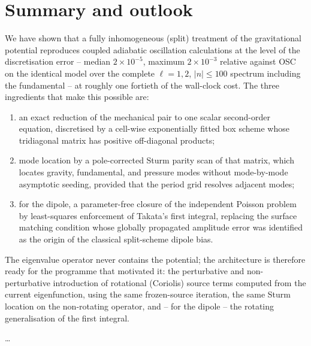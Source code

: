 \documentclass[]{aa}
\begin{document}
\section{Summary and outlook}
\label{sec:conclusion}

We have shown that a fully inhomogeneous (split) treatment of the
gravitational potential reproduces coupled adiabatic oscillation
calculations at the level of the discretisation error -- median
$2\times10^{-5}$, maximum $2\times10^{-3}$ relative against OSC on the
identical model over the complete $\ell=1,2$, $|n|\le100$ spectrum including
the fundamental -- at roughly one fortieth of the wall-clock cost.  The three
ingredients that make this possible are:

\begin{enumerate}
\item an exact reduction of the mechanical pair to one scalar second-order
  equation, discretised by a cell-wise exponentially fitted box scheme whose
  tridiagonal matrix has positive off-diagonal products;
\item mode location by a pole-corrected Sturm parity scan of that matrix,
  which locates gravity, fundamental, and pressure modes without mode-by-mode
  asymptotic seeding, provided that the period grid resolves adjacent modes;
\item for the dipole, a parameter-free closure of the independent Poisson
  problem by least-squares enforcement of Takata's first integral, replacing
  the surface matching condition whose globally propagated amplitude error
  was identified as the origin of the classical split-scheme dipole bias.
\end{enumerate}

The eigenvalue operator never contains the potential; the architecture is
therefore ready for the programme that motivated it: the perturbative and
non-perturbative introduction of rotational (Coriolis) source terms computed
from the current eigenfunction, using the same frozen-source iteration, the
same Sturm location on the non-rotating operator, and -- for the dipole --
the rotating generalisation of the first integral.

\begin{acknowledgements}
\dots
\end{acknowledgements}
\end{document}

